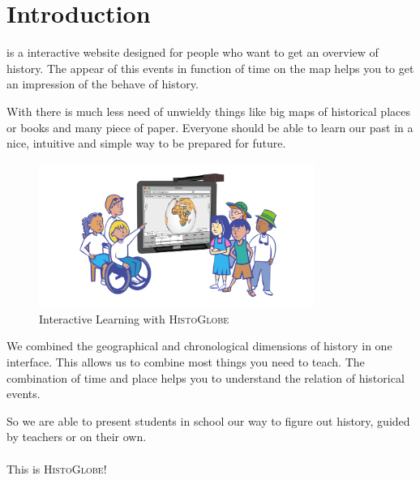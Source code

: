 \section{Introduction} %
\label{sec:introduction}

\HG is a interactive website designed for people who want to get an overview of history. The appear of this events in function of time on the map helps you to get an impression of the behave of history.

With \HG there is much less need of unwieldy things like big maps of historical places or books and many piece of paper. Everyone should be able to learn our past in a nice, intuitive and simple way to be prepared for future.

\begin{figure}[H]
	\centering
	\includegraphics[width=0.8\textwidth]{graphics/everybody.jpg}
	\caption{Interactive Learning with \textsc{HistoGlobe}}
	\label{fig:everybody}
\end{figure}

We combined the geographical and chronological dimensions of history in one interface. This allows us to combine most things you need to teach. The combination of time and place helps you to understand the relation of historical events.

So we are able to present students in school our way to figure out history, guided by teachers or on their own.
\\
\\
This is \textsc{HistoGlobe}!

